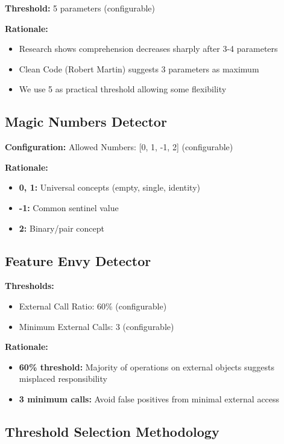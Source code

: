 \documentclass[11pt,a4paper]{article}
\begin{document}
\textbf{Threshold:} 5 parameters (configurable)

\textbf{Rationale:}
\begin{itemize}[noitemsep]
    \item Research shows comprehension decreases sharply after 3-4 parameters
    \item Clean Code (Robert Martin) suggests 3 parameters as maximum
    \item We use 5 as practical threshold allowing some flexibility
\end{itemize}

\subsection{Magic Numbers Detector}

\textbf{Configuration:} Allowed Numbers: [0, 1, -1, 2] (configurable)

\textbf{Rationale:}
\begin{itemize}[noitemsep]
    \item \textbf{0, 1:} Universal concepts (empty, single, identity)
    \item \textbf{-1:} Common sentinel value
    \item \textbf{2:} Binary/pair concept
\end{itemize}

\subsection{Feature Envy Detector}

\textbf{Thresholds:}
\begin{itemize}[noitemsep]
    \item External Call Ratio: 60\% (configurable)
    \item Minimum External Calls: 3 (configurable)
\end{itemize}

\textbf{Rationale:}
\begin{itemize}[noitemsep]
    \item \textbf{60\% threshold:} Majority of operations on external objects suggests misplaced responsibility
    \item \textbf{3 minimum calls:} Avoid false positives from minimal external access
\end{itemize}

\subsection{Threshold Selection Methodology}
\end{document}
